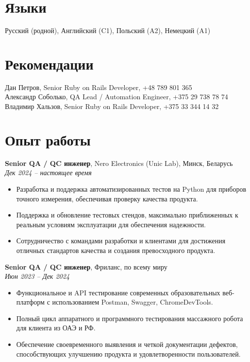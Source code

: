 \documentclass[11pt,a4paper]{article}
\begin{document}
\section*{Языки}
Русский (родной), Английский (C1), Польский (A2), Немецкий (A1)

\section*{Рекомендации}
Дан Петров, Senior Ruby on Rails Developer, +48 789 801 365 \\
Александр Соболько, QA Lead / Automation Engineer, +375 29 738 78 74 \\
Владимир Хальзов, Senior Ruby on Rails Developer, +375 33 344 14 32

\section*{Опыт работы}

\textbf{Senior QA / QC инженер}, Nero Electronics (Unic Lab), Минск, Беларусь \\
\textit{Дек 2024 -- настоящее время}
\begin{itemize}
  \item Разработка и поддержка автоматизированных тестов на Python для приборов точного измерения, обеспечивая проверку качества продукта.
  \item Поддержка и обновление тестовых стендов, максимально приближенных к реальным условиям эксплуатации для обеспечения надежности.
  \item Сотрудничество с командами разработки и клиентами для достижения отличных стандартов качества и создания превосходного продукта.
\end{itemize}

\textbf{Senior QA / QC инженер}, Фриланс, по всему миру \\
\textit{Июн 2023 -- Дек 2024}
\begin{itemize}
  \item Функциональное и API тестирование современных образовательных веб-платформ с использованием Postman, Swagger, ChromeDevTools.
  \item Полный цикл аппаратного и программного тестирования массажного робота для клиента из ОАЭ и РФ.
  \item Обеспечение своевременного выявления и четкой документации дефектов, способствующих улучшению продукта и удовлетворенности пользователей.
\end{itemize}
\end{document}
